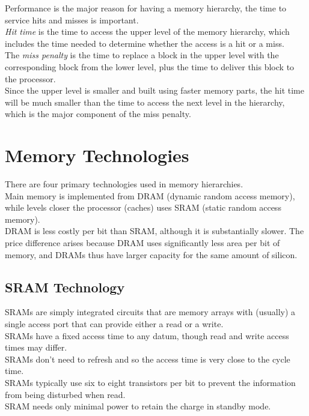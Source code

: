 \documentclass[12pt]{article}
\theoremstyle{definition}
\begin{document}
  Performance is the major reason for having a memory hierarchy, the time to service hits and misses is important. \\
  \emph{Hit time} is the time to access the upper level of the memory hierarchy, which includes the time needed to determine whether the access is a hit or a miss. \\
  The \emph{miss penalty} is the time to replace a block in the upper level with the corresponding block from the lower level, plus the time to deliver this block to the processor. \\
  Since the upper level is smaller and built using faster memory parts, the hit time will be much smaller than the time to access the next level in the hierarchy, which is the major component of the miss penalty.

  \section{Memory Technologies}
  There are four primary technologies used in memory hierarchies. \\
  Main memory is implemented from DRAM (dynamic random access memory), while levels closer the processor (caches) uses SRAM (static random access memory). \\
  DRAM is less costly per bit than SRAM, although it is substantially slower.
  The price difference arises because DRAM uses significantly less area per bit of memory, and DRAMs thus have larger capacity for the same amount of silicon. \\

  \subsection{SRAM Technology}
  SRAMs are simply integrated circuits that are memory arrays with (usually) a single access port that can provide either a read or a write. \\
  SRAMs have a fixed access time to any datum, though read and write access times may differ. \\
  SRAMs don't need to refresh and so the access time is very close to the cycle time. \\
  SRAMs typically use six to eight transistors per bit to prevent the information from being disturbed when read. \\
  SRAM needs only minimal power to retain the charge in standby mode.
\end{document}
